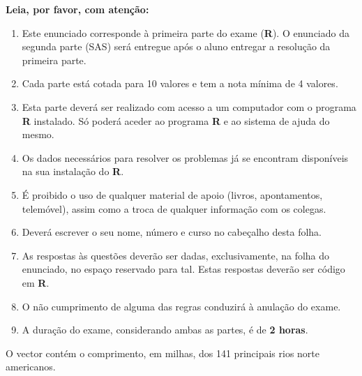 \documentclass[addpoints]{exam}
\begin{document}
{{\large\textbf{Leia, por favor, com atenção:}}
\begin{enumerate}
	\item Este enunciado corresponde à primeira parte do exame (\textbf{R}). O enunciado da segunda parte (SAS) será entregue após o aluno entregar a resolução da primeira parte.
	\item Cada parte está cotada para 10 valores e tem a nota mínima de 4 valores. 
	\item Esta parte deverá ser realizado com acesso a um computador com o programa \textbf{R} instalado. Só poderá aceder ao programa \textbf{R} e ao sistema de ajuda do mesmo.
	\item Os dados necessários para resolver os problemas já se encontram disponíveis na sua instalação do \textbf{R}.
	\item É proibido o uso de qualquer material de apoio (livros, apontamentos, telemóvel), assim como a troca de qualquer informação com os colegas.
	\item Deverá escrever o seu nome, número e curso no cabeçalho desta folha.
	\item As respostas às questões deverão ser dadas, exclusivamente, na folha do enunciado, no espaço reservado para tal. Estas respostas deverão ser código em \textbf{R}.
	\item O não cumprimento de alguma das regras conduzirá à anulação do exame.
	\item A duração do exame, considerando ambas as partes, é de \textbf{2 horas}.
\end{enumerate}

\vspace{10mm}

\begin{questions}
	\question O vector  contém o comprimento, em milhas, dos 141 principais rios norte americanos.
	
\end{questions}}
\end{document}
